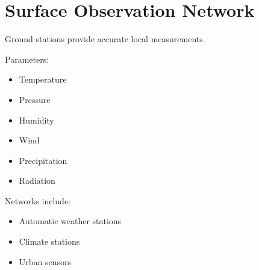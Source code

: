 \section{Surface Observation Network}


Ground stations provide accurate local measurements.



Parameters:


\begin{itemize}

\item Temperature

\item Pressure

\item Humidity

\item Wind

\item Precipitation

\item Radiation

\end{itemize}



Networks include:


\begin{itemize}

\item Automatic weather stations

\item Climate stations

\item Urban sensors

\end{itemize}
